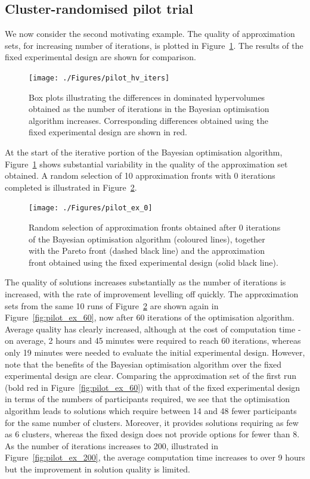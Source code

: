 \documentclass{article} %
\begin{document}
\subsection{Cluster-randomised pilot trial}

We now consider the second motivating example. The quality of approximation sets, for increasing number of iterations, is plotted in Figure~\ref{fig:pilot_hv_iters}. The results of the fixed experimental design are shown for comparison.

\begin{figure}
\centering
\texttt{[image: ./Figures/pilot\_hv\_iters]}
\caption{Box plots illustrating the differences in dominated hypervolumes obtained as the number of iterations in the Bayesian optimisation algorithm increases. Corresponding differences obtained using the fixed experimental design are shown in red.}
\label{fig:pilot_hv_iters}
\end{figure}

At the start of the iterative portion of the Bayesian optimisation algorithm, Figure~\ref{fig:pilot_hv_iters} shows substantial variability in the quality of the approximation set obtained. A random selection of 10 approximation fronts with 0 iterations completed is illustrated in Figure~\ref{fig:pilot_ex_0}.

\begin{figure}
\centering
\texttt{[image: ./Figures/pilot\_ex\_0]}
\caption{Random selection of approximation fronts obtained after 0 iterations of the Bayesian optimisation algorithm (coloured lines), together with the Pareto front (dashed black line) and the approximation front obtained using the fixed experimental design (solid black line).}
\label{fig:pilot_ex_0}
\end{figure}

The quality of solutions increases substantially as the number of iterations is increased, with the rate of improvement levelling off quickly. The approximation sets from the same 10 runs of Figure~\ref{fig:pilot_ex_0} are shown again in Figure~\ref{fig:pilot_ex_60}, now after 60 iterations of the optimisation algorithm. Average quality has clearly increased, although at the cost of computation time - on average, 2 hours and 45 minutes were required to reach 60 iterations, whereas only 19 minutes were needed to evaluate the initial experimental design. However, note that the benefits of the Bayesian optimisation algorithm over the fixed experimental design are clear. Comparing the approximation set of the first run (bold red in Figure~\ref{fig:pilot_ex_60}) with that of the fixed experimental design in terms of the numbers of participants required, we see that the optimisation algorithm leads to solutions which require between 14 and 48 fewer participants for the same number of clusters. Moreover, it provides solutions requiring as few as 6 clusters, whereas the fixed design does not provide options for fewer than 8. As the number of iterations increases to 200, illustrated in Figure~\ref{fig:pilot_ex_200}, the average computation time increases to over 9 hours but the improvement in solution quality is limited.
\end{document}
